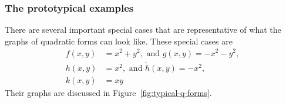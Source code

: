 \subsubsection*{The prototypical examples}

There are several important special cases that are representative of what the
graphs of quadratic forms can look like.  These special cases are
\begin{subequations}
  \begin{align}
    f(x,y) & = x^2+y^2, \text{ and } g(x,y) = -x^2-y^2,
    \label{eq:qform-definite}\\
    h(x,y) & = x^2, \text{ and } \tilde h(x,y) = -x^2,
    \label{eq:qform-semidefinite}\\
    k(x,y) & = xy
    \label{eq:qform-indefinite}
  \end{align}
\end{subequations}
Their graphs are discussed in Figure~\ref{fig:typical-q-forms}.
